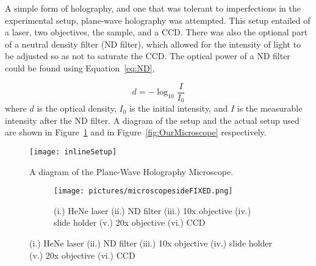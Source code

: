 A simple form of holography, and one that was tolerant to imperfections in the
experimental setup, plane-wave holography was attempted. This
setup entailed of a laser, two objectives, the sample, and a CCD\@. There was
also the optional part of a neutral density filter (ND filter), which allowed for the
intensity of light to be adjusted so as not to saturate the CCD\@.
The optical power of a ND filter could be found using
Equation~\ref{eq:ND},

\begin{equation}
    d = -\log_{10}\frac{I}{I_0}
    \label{eq:ND}
\end{equation}
where $d$ is the optical density, $I_0$ is the initial intensity, and $I$ is
the measurable intensity after the ND filter.
A diagram of
the setup and the actual setup used are shown in Figure~\ref{fig:inlineSetup}
and in Figure~\ref{fig:OurMicroscope} respectively.



\begin{figure}[htbp!]
    \begin{center}
        \texttt{[image: inlineSetup]}
    \end{center}
    \caption{A diagram of the Plane-Wave Holography Microscope.}
    \label{fig:inlineSetup}
\end{figure}


\begin{figure}[ht!]
    \begin{center}

        \begin{subfigure}[t]{\textwidth}
            \label{fig:OurMicroscopeSide}
            \texttt{[image: pictures/microscopesideFIXED.png]}
            \caption{(i.) HeNe laser (ii.) ND filter (iii.) 10x objective (iv.)
                slide holder (v.) 20x objective (vi.) CCD
            }
        \end{subfigure}
%

    \end{center}
\end{figure}

